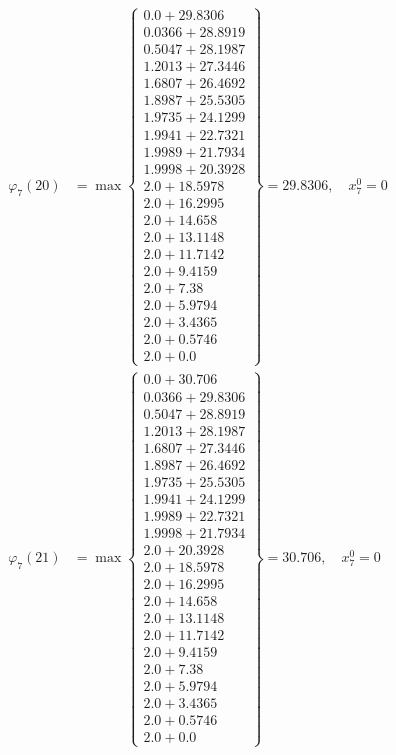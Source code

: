\documentclass{article}
\begin{document}
\begin{align*}
\varphi_{7}(20) &= \max \left\{ \begin{array}{c}
0.0 + 29.8306 \\
 0.0366 + 28.8919 \\
 0.5047 + 28.1987 \\
 1.2013 + 27.3446 \\
 1.6807 + 26.4692 \\
 1.8987 + 25.5305 \\
 1.9735 + 24.1299 \\
 1.9941 + 22.7321 \\
 1.9989 + 21.7934 \\
 1.9998 + 20.3928 \\
 2.0 + 18.5978 \\
 2.0 + 16.2995 \\
 2.0 + 14.658 \\
 2.0 + 13.1148 \\
 2.0 + 11.7142 \\
 2.0 + 9.4159 \\
 2.0 + 7.38 \\
 2.0 + 5.9794 \\
 2.0 + 3.4365 \\
 2.0 + 0.5746 \\
 2.0 + 0.0
\end{array} \right\}=29.8306, \quad x_{7}^0=0\\
  
\varphi_{7}(21) &= \max \left\{ \begin{array}{c}
0.0 + 30.706 \\
 0.0366 + 29.8306 \\
 0.5047 + 28.8919 \\
 1.2013 + 28.1987 \\
 1.6807 + 27.3446 \\
 1.8987 + 26.4692 \\
 1.9735 + 25.5305 \\
 1.9941 + 24.1299 \\
 1.9989 + 22.7321 \\
 1.9998 + 21.7934 \\
 2.0 + 20.3928 \\
 2.0 + 18.5978 \\
 2.0 + 16.2995 \\
 2.0 + 14.658 \\
 2.0 + 13.1148 \\
 2.0 + 11.7142 \\
 2.0 + 9.4159 \\
 2.0 + 7.38 \\
 2.0 + 5.9794 \\
 2.0 + 3.4365 \\
 2.0 + 0.5746 \\
 2.0 + 0.0
\end{array} \right\}=30.706, \quad x_{7}^0=0\\
  

\end{align*}
\end{document}
